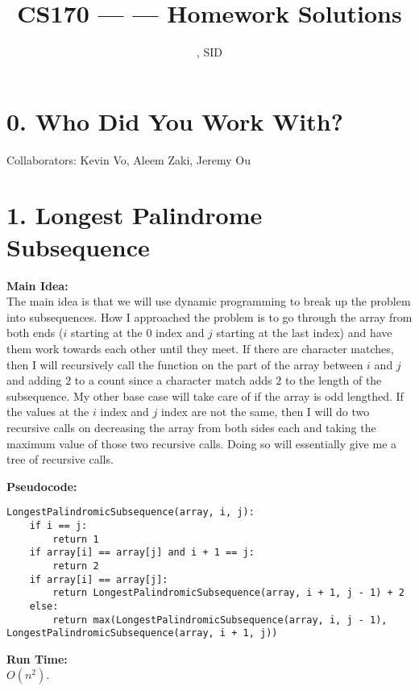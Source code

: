 \documentclass[11pt]{article}
\title{CS170 --- \Session --- Homework \Homework \space Solutions}
\author{\Name, SID \SID}
\date{}
\newenvironment{mainIdea}{\par{\bf Main Idea:}}{\smallskip}
\newenvironment{pseudocode}{\par{\bf Pseudocode:}}{\smallskip}
\newenvironment{runTime}{\par{\bf Run Time:}}{\smallskip}
\begin{document}
\maketitle

\section*{0. Who Did You Work With?}

Collaborators: Kevin Vo, Aleem Zaki, Jeremy Ou



\newpage
\section*{1. Longest Palindrome Subsequence}
\begin{mainIdea}
\\
The main idea is that we will use dynamic programming to break up the problem into subsequences. How I approached the problem is to go through the array from both ends ($i$ starting at the $0$ index and $j$ starting at the last index) and have them work towards each other until they meet. If there are character matches, then I will recursively call the function on the part of the array between $i$ and $j$ and adding $2$ to a count since a character match adds $2$ to the length of the subsequence. My other base case will take care of if the array is odd lengthed. If the values at the $i$ index and $j$ index are not the same, then I will do two recursive calls on decreasing the array from both sides each and taking the maximum value of those two recursive calls. Doing so will essentially give me a tree of recursive calls.
\end{mainIdea}
\\
\begin{pseudocode}
\begin{lstlisting}
LongestPalindromicSubsequence(array, i, j):
	if i == j:
		return 1
	if array[i] == array[j] and i + 1 == j:
		return 2
	if array[i] == array[j]:
		return LongestPalindromicSubsequence(array, i + 1, j - 1) + 2
	else:
		return max(LongestPalindromicSubsequence(array, i, j - 1), LongestPalindromicSubsequence(array, i + 1, j))
\end{lstlisting}
\end{pseudocode}
\begin{runTime}
\\
$O(n ^ 2)$.
\end{runTime}
\\
\end{document}
